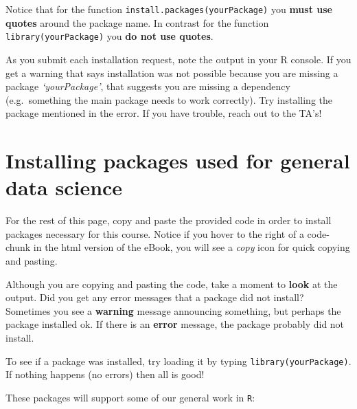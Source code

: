 \documentclass[
]{book}
\newenvironment{rmdcaution}[1]
  {
  \begin{itemize}
  \renewcommand{\labelitemi}{
    \raisebox{-.7\height}[0pt][0pt]{
      {\setkeys{Gin}{width=3em,keepaspectratio}\texttt{[image: images/\#1]}}
    }
  }
  \setlength{\fboxsep}{1em}
  \begin{caution}
  \item
  }
  {
  \end{caution}
  \end{itemize}
  }
\newenvironment{rmdnote}[1]
  {
  \begin{itemize}
  \renewcommand{\labelitemi}{
    \raisebox{-.7\height}[0pt][0pt]{
      {\setkeys{Gin}{width=3em,keepaspectratio}\texttt{[image: images/\#1]}}
    }
  }
  \setlength{\fboxsep}{1em}
  \begin{note}
  \item
  }
  {
  \end{note}
  \end{itemize}
  }
\newenvironment{rmdtip}[1]
  {
  \begin{itemize}
  \renewcommand{\labelitemi}{
    \raisebox{-.7\height}[0pt][0pt]{
      {\setkeys{Gin}{width=3em,keepaspectratio}\texttt{[image: images/\#1]}}
    }
  }
  \setlength{\fboxsep}{1em}
  \begin{tip}
  \item
  }
  {
  \end{tip}
  \end{itemize}
  }
\begin{document}
\begin{rmdnote}{note}
Notice that for the function \texttt{install.packages(\textquotesingle{}yourPackage\textquotesingle{})} you \textbf{must use quotes} around the package name. In contrast for the function \texttt{library(yourPackage)} you \textbf{do not use quotes}.

\end{rmdnote}

\begin{rmdcaution}{caution}
As you submit each installation request, note the output in your R console. If you get a warning that says installation was not possible because you are missing a package \emph{`yourPackage'}, that suggests you are missing a dependency (e.g.~something the main package needs to work correctly). Try installing the package mentioned in the error. If you have trouble, reach out to the TA's!

\end{rmdcaution}

\hypertarget{installing-packages-used-for-general-data-science}{%
\section*{Installing packages used for general data science}\label{installing-packages-used-for-general-data-science}}

For the rest of this page, copy and paste the provided code in order to install packages necessary for this course. Notice if you hover to the right of a code-chunk in the html version of the eBook, you will see a \emph{copy} icon for quick copying and pasting.

\begin{rmdtip}{tip}
Although you are copying and pasting the code, take a moment to \textbf{look} at the output. Did you get any error messages that a package did not install? Sometimes you see a \textbf{warning} message announcing something, but perhaps the package installed ok. If there is an \textbf{error} message, the package probably did not install.

To see if a package was installed, try loading it by typing \texttt{library(yourPackage)}. If nothing happens (no errors) then all is good!

\end{rmdtip}

These packages will support some of our general work in \texttt{R}:
\end{document}
